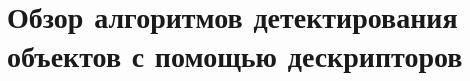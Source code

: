 %			
%			
%			
%			
%			
%			
%			



\section{Обзор алгоритмов детектирования объектов с помощью дескрипторов}

